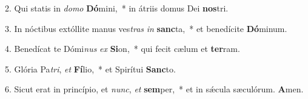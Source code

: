 2. Qui statis in \textit{do}\textit{mo} \textbf{Dó}mini,~*  in átriis domus Dei \textbf{nos}tri.\

3. In nóctibus extóllite manus ves\textit{tras} \textit{in} \textbf{sanc}ta,~*  et benedícite \textbf{Dó}minum.\

4. Benedícat te Dómi\textit{nus} \textit{ex} \textbf{Si}on,~*  qui fecit cælum et \textbf{ter}ram.\

5. Glória Pa\textit{tri}, \textit{et} \textbf{Fí}lio,~*  et Spirítui \textbf{Sanc}to.\

6. Sicut erat in princípio, et \textit{nunc}, \textit{et} \textbf{sem}per,~*  et in sǽcula sæculórum. \textbf{A}men.\

